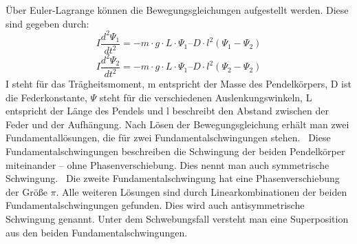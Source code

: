 \documentclass[12pt,a4paper,]{scrreprt}
\begin{document}
Über Euler-Lagrange können die Bewegungsgleichungen aufgestellt werden. Diese sind gegeben durch:
\begin{equation}
I\frac{d^2\Psi _1}{dt^2}= -m\cdot g\cdot L\cdot\Psi_1 – D\cdot l^2(\Psi_1 - \Psi_2)
\end{equation}
\begin{equation}
I\frac{d^2\Psi _2}{dt^2}= - m\cdot g\cdot L\cdot\Psi_1 – D\cdot l^2(\Psi_2 - \Psi_2)
\end{equation}
I steht für das Trägheitsmoment, m entspricht der Masse des Pendelkörpers, D ist die Federkonstante, $\Psi$ steht für die verschiedenen Auslenkungswinkeln, L entspricht der Länge des Pendels und l beschreibt den Abstand zwischen der Feder und der Aufhängung. Nach Lösen der Bewegungsgleichung erhält man zwei Fundamentallösungen, die für zwei Fundamentalschwingungen stehen. \
 Diese Fundamentalschwingungen beschreiben  die Schwingung der beiden Pendelkörper miteinander – ohne Phasenverschiebung. Dies nennt man auch symmetrische Schwingung. \ 
 Die zweite Fundamentalschwingung hat eine Phasenverschiebung der Größe  $\pi$.  Alle weiteren Lösungen sind durch Linearkombinationen der beiden Fundamentalschwingungen gefunden. Dies wird auch antisymmetrische Schwingung genannt. Unter dem Schwebungsfall versteht man eine Superposition aus den beiden Fundamentalschwingungen.%
\end{document}
